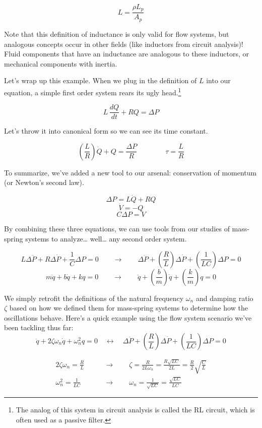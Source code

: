 \documentclass[
  letterpaper,
  DIV=11,
  numbers=noendperiod]{scrreprt}
\begin{document}
\[L = \frac{\rho L_p}{A_p}\]

Note that this definition of inductance is only valid for flow systems,
but analogous concepts occur in other fields (like inductors from
circuit analysis)! Fluid components that have an inductance are
analogous to these inductors, or mechanical components with inertia.

Let's wrap up this example. When we plug in the definition of \(L\) into
our equation, a simple first order system rears its ugly
head.\footnote{The analog of this system in circuit analysis is called
  the RL circuit, which is often used as a passive filter.}

\[L \, \frac{dQ}{dt} + RQ = \Delta P\]

Let's throw it into canonical form so we can see its time constant.

\[\left(\frac{L}{R}\right) \dot{Q} + Q = \frac{\Delta P}{R} \qquad \qquad \tau = \frac{L}{R}\]

To summarize, we've added a new tool to our arsenal: conservation of
momentum (or Newton's second law).

\[\Delta P = L \dot{Q} + RQ\] \[\dot{V} = -Q\] \[C \Delta P = V\]

By combining these three equations, we can use tools from our studies of
mass-spring systems to analyze\ldots{} well\ldots{} any second order
system.

\[L \Delta \ddot{P} + R \Delta \dot{P} + \frac{1}{C} \Delta P = 0 \qquad \to \qquad \Delta \ddot{P} + \left(\frac{R}{L}\right) \Delta \dot{P} + \left(\frac{1}{LC}\right) \Delta P = 0\]
\[m \ddot{q} + b \dot{q} + k q = 0 \qquad \to \qquad \ddot{q} + \left(\frac{b}{m}\right) \dot{q} + \left(\frac{k}{m}\right) q = 0\]

We simply retrofit the definitions of the natural frequency \(\omega_n\)
and damping ratio \(\zeta\) based on how we defined them for mass-spring
systems to determine how the oscillations behave. Here's a quick example
using the flow system scenario we've been tackling thus far:
\[\ddot{q} + 2\zeta\omega_n \dot{q} + \omega_n^2 q = 0 \quad \longleftrightarrow \quad  \Delta \ddot{P} + \left(\frac{R}{L}\right) \Delta \dot{P} + \left(\frac{1}{LC}\right) \Delta P = 0\]

\begin{align*}
    2 \zeta \omega_n = \frac{R}{L} \qquad &\longrightarrow \qquad \zeta = \frac{R}{2L \omega_n} = \frac{R\sqrt{LC}}{2L} = \frac{R}{2} \sqrt{\frac{C}{L}}\\
    \omega_n^2 = \frac{1}{LC} \qquad &\longrightarrow \qquad \omega_n = \frac{1}{\sqrt{LC}} = \frac{\sqrt{LC}}{LC}
\end{align*}
\end{document}
